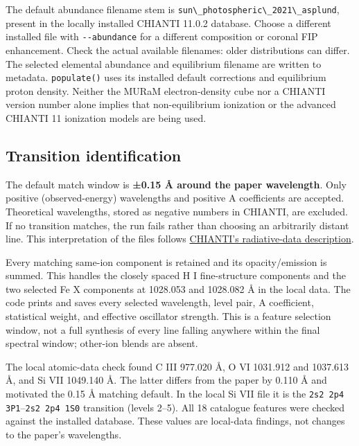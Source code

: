 \documentclass[
]{article}
\newcommand{\passthrough}[1]{#1}
\begin{document}
The default abundance filename stem is
\passthrough{\lstinline!sun\_photospheric\_2021\_asplund!}, present in
the locally installed CHIANTI 11.0.2 database. Choose a different
installed file with \passthrough{\lstinline!--abundance!} for a
different composition or coronal FIP enhancement. Check the actual
available filenames: older distributions can differ. The selected
elemental abundance and equilibrium filename are written to metadata.
\passthrough{\lstinline!populate()!} uses its installed default
corrections and equilibrium proton density. Neither the MURaM
electron-density cube nor a CHIANTI version number alone implies that
non-equilibrium ionization or the advanced CHIANTI 11 ionization models
are being used.

\subsection{Transition identification}\label{transition-identification}

The default match window is \textbf{±0.15 Å around the paper
wavelength}. Only positive (observed-energy) wavelengths and positive A
coefficients are accepted. Theoretical wavelengths, stored as negative
numbers in CHIANTI, are excluded. If no transition matches, the run
fails rather than choosing an arbitrarily distant line. This
interpretation of the files follows
\href{https://www.chiantidatabase.org/cug.pdf}{CHIANTI's radiative-data
description}.

Every matching same-ion component is retained and its opacity/emission
is summed. This handles the closely spaced H I fine-structure components
and the two selected Fe X components at 1028.053 and 1028.082 Å in the
local data. The code prints and saves every selected wavelength, level
pair, A coefficient, statistical weight, and effective oscillator
strength. This is a feature selection window, not a full synthesis of
every line falling anywhere within the final spectral window; other-ion
blends are absent.

The local atomic-data check found C III 977.020 Å, O VI 1031.912 and
1037.613 Å, and Si VII 1049.140 Å. The latter differs from the paper by
0.110 Å and motivated the 0.15 Å matching default. In the local Si VII
file it is the
\passthrough{\lstinline!2s2 2p4 3P1!}--\passthrough{\lstinline!2s2 2p4 1S0!}
transition (levels 2--5). All 18 catalogue features were checked against
the installed database. These values are local-data findings, not
changes to the paper's wavelengths.
\end{document}
